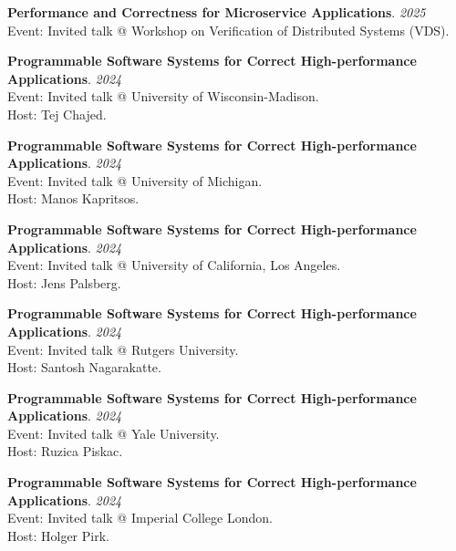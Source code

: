 \begin{minipage}{\textwidth}
\textbf{Performance and Correctness for Microservice Applications}. \hfill {\em 2025}\\
Event: Invited talk @ Workshop on Verification of Distributed Systems (VDS).
\end{minipage}

\begin{minipage}{\textwidth}
\textbf{Programmable Software Systems for Correct High-performance Applications}. \hfill {\em 2024}\\
Event: Invited talk @ University of Wisconsin-Madison.\\
 Host: Tej Chajed.
\end{minipage}

\begin{minipage}{\textwidth}
\textbf{Programmable Software Systems for Correct High-performance Applications}. \hfill {\em 2024}\\
Event: Invited talk @ University of Michigan.\\
 Host: Manos Kapritsos.
\end{minipage}

\begin{minipage}{\textwidth}
\textbf{Programmable Software Systems for Correct High-performance Applications}. \hfill {\em 2024}\\
Event: Invited talk @ University of California, Los Angeles.\\
 Host: Jens Palsberg.
\end{minipage}

\begin{minipage}{\textwidth}
\textbf{Programmable Software Systems for Correct High-performance Applications}. \hfill {\em 2024}\\
Event: Invited talk @ Rutgers University.\\
 Host: Santosh Nagarakatte.
\end{minipage}

\begin{minipage}{\textwidth}
\textbf{Programmable Software Systems for Correct High-performance Applications}. \hfill {\em 2024}\\
Event: Invited talk @ Yale University.\\
 Host: Ruzica Piskac.
\end{minipage}

\begin{minipage}{\textwidth}
\textbf{Programmable Software Systems for Correct High-performance Applications}. \hfill {\em 2024}\\
Event: Invited talk @ Imperial College London.\\
 Host: Holger Pirk.
\end{minipage}


